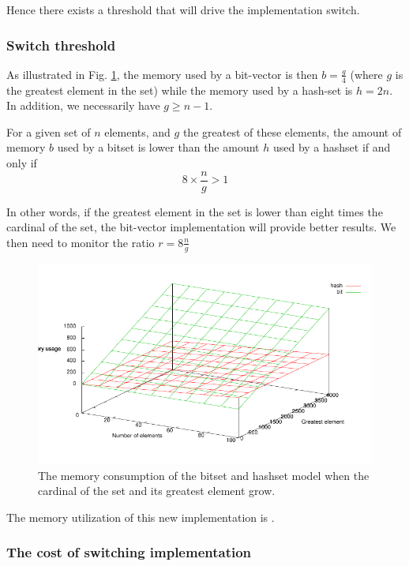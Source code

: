 \documentclass{article}
\begin{document}
Hence there exists a threshold that will drive the implementation switch.


\subsubsection{Switch threshold}



As illustrated in Fig. \ref{fig-mem}, the memory used by a bit-vector is then $b = \frac{g}{4}$ (where $g$ is the greatest element in the set)
while the memory used by a hash-set is $h = 2n$. In addition, we necessarily have $g\ge n - 1$. 

For a given set of $n$ elements, and $g$ the greatest of these elements, the amount of memory $b$ used
by a bitset is lower than the amount $h$ used by a hashset if and only if $$8\times \frac{n}{g} > 1$$
  
In other words, if the greatest element in the set is lower than eight times the cardinal of the set, the bit-vector implementation will provide better results.
We then need to monitor the ratio $r = 8\frac{n}{g}$ 

\begin{figure}[htp]
\begin{center}
  \includegraphics[width=\textwidth]{fig/mem/a}
  \caption[labelInTOC]{The memory consumption of the bitset and hashset model when the cardinal of the set and
  its greatest element grow.}
  \label{fig-mem}
\end{center}
\end{figure}





The memory utilization of this new implementation is .


\subsubsection{The cost of switching implementation}
\end{document}
